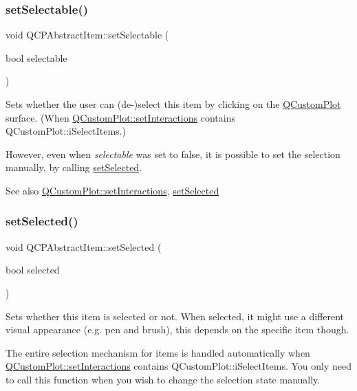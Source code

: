 \subsubsection{\texorpdfstring{set\+Selectable()}{setSelectable()}}
{\footnotesize\ttfamily void Q\+C\+P\+Abstract\+Item\+::set\+Selectable (\begin{DoxyParamCaption}\item[{bool}]{selectable }\end{DoxyParamCaption})}

Sets whether the user can (de-\/)select this item by clicking on the \hyperlink{class_q_custom_plot}{Q\+Custom\+Plot} surface. (When \hyperlink{class_q_custom_plot_a5ee1e2f6ae27419deca53e75907c27e5}{Q\+Custom\+Plot\+::set\+Interactions} contains Q\+Custom\+Plot\+::i\+Select\+Items.)

However, even when {\itshape selectable} was set to false, it is possible to set the selection manually, by calling \hyperlink{class_q_c_p_abstract_item_a203de94ad586cc44d16c9565f49d3378}{set\+Selected}.

\begin{DoxySeeAlso}{See also}
\hyperlink{class_q_custom_plot_a5ee1e2f6ae27419deca53e75907c27e5}{Q\+Custom\+Plot\+::set\+Interactions}, \hyperlink{class_q_c_p_abstract_item_a203de94ad586cc44d16c9565f49d3378}{set\+Selected} 
\end{DoxySeeAlso}
\mbox{\label{class_q_c_p_abstract_item_a203de94ad586cc44d16c9565f49d3378}} 
\subsubsection{\texorpdfstring{set\+Selected()}{setSelected()}}
{\footnotesize\ttfamily void Q\+C\+P\+Abstract\+Item\+::set\+Selected (\begin{DoxyParamCaption}\item[{bool}]{selected }\end{DoxyParamCaption})}

Sets whether this item is selected or not. When selected, it might use a different visual appearance (e.\+g. pen and brush), this depends on the specific item though.

The entire selection mechanism for items is handled automatically when \hyperlink{class_q_custom_plot_a5ee1e2f6ae27419deca53e75907c27e5}{Q\+Custom\+Plot\+::set\+Interactions} contains Q\+Custom\+Plot\+::i\+Select\+Items. You only need to call this function when you wish to change the selection state manually.

